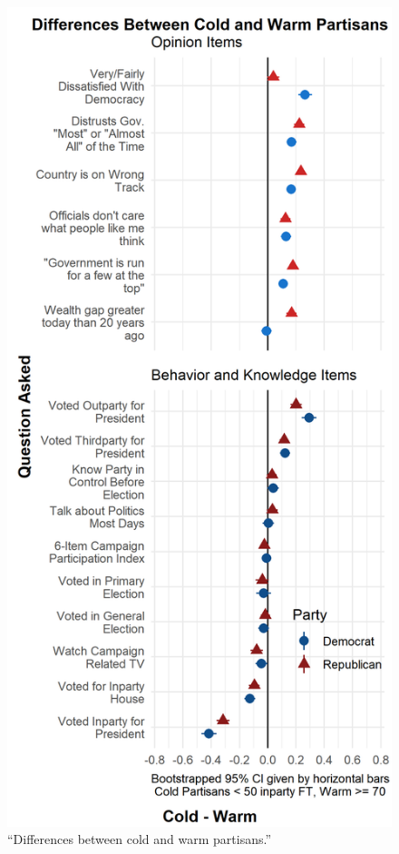 \documentclass[
]{article}
\begin{document}
\begin{figure}
\centering
\includegraphics{../fig-4.png}
\caption{``Differences between cold and warm partisans.''}
\end{figure}
\end{document}
